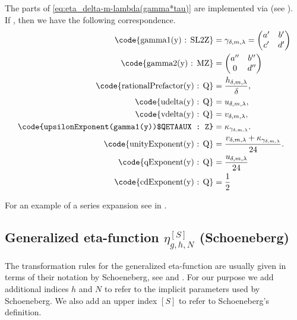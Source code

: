 \documentclass{article}
\begin{document}
The parts of \eqref{eq:eta_delta-m-lambda(gamma*tau)} are implemented
via \textcolor{blue}{} (see
).
\\
If , then we have the
following correspondence.
\begin{align*}
  \text{\code{gamma1(y) : SL2Z}}
  &=
    \gamma_{\delta,m,\lambda} = \begin{pmatrix}a'&b'\\c'&d'\end{pmatrix}
  \\
  \text{\code{gamma2(y) : MZ}}
  &=
    \begin{pmatrix}a''&b''\\0&d''\end{pmatrix}
  \\
  \text{\code{rationalPrefactor(y) : Q}}
  &=
    \frac{h_{\delta,m,\lambda}}{\delta},
  \\
  \text{\code{udelta(y) : Q}}
  &=
    u_{\delta,m,\lambda},
  \\
  \text{\code{vdelta(y) : Q}}
  &=
    v_{\delta,m,\lambda},
  \\
  \text{\code{upsilonExponent(gamma1(y))$QETAAUX : Z}}
  &=
    \kappa_{\gamma_{\delta,m,\lambda}}.
  \\
  \text{\code{unityExponent(y) : Q}}
  &=
    \frac{v_{\delta,m,\lambda} + \kappa_{\gamma_{\delta,m,\lambda}}}{24}.
  \\
  \text{\code{qExponent(y) : Q}}
  &=
    \frac{u_{\delta,m,\lambda}}{24}
  \\
  \text{\code{cdExponent(y) : Q}}
  &=
    \frac{1}{2}
\end{align*}

For an example of a series expansion see
 in
.







\subsection{Generalized eta-function $\eta_{g,h,N}^{[S]}$ (Schoeneberg)}

The transformation rules for the generalized eta-function are
usually given in terms of their notation by Schoeneberg, see
\cite[Chp.~VIII]{Schoeneberg_EllipticModularFunctions_1974} and
\cite{ChenDuZhao_FindingModularFunctionsRamanujan_2019}. For our
purpose we add additional indices $h$ and $N$ to refer to the
implicit parameters used by Schoeneberg. We also add an upper index
$[S]$ to refer to Schoeneberg's definition.
\end{document}
